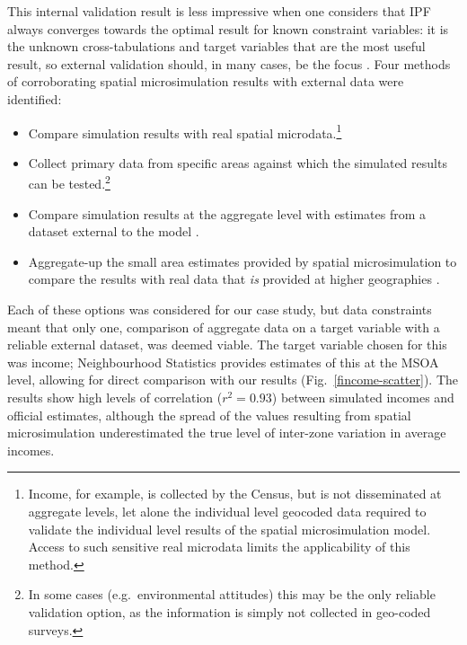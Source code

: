 This internal validation
result is less impressive when one considers that IPF always converges
towards the optimal result for known constraint variables:
it is the unknown cross-tabulations and
target variables that are the most useful result,
so external validation should, in many cases, be the focus
\citep{Morrissey2008, edwards2013validation}.
Four methods of corroborating spatial microsimulation results with external
data were identified:
\begin{itemize}
 \item Compare simulation results with real spatial microdata.\footnote{Income,
for example, is collected by the Census, but is not disseminated at aggregate
levels, let alone the individual level geocoded data required to validate the
individual level results of the spatial microsimulation model. Access to such
sensitive real microdata limits the applicability of this method.}
\item Collect primary data from specific areas against which the simulated
results can be tested.\footnote{In some cases (e.g.~environmental attitudes)
this may be the only reliable validation option, as the information is simply not
collected in geo-coded surveys.}
\item Compare simulation results at the aggregate level with estimates
from a dataset external to the model \citep{Morrissey2013}.
\item Aggregate-up the small area estimates provided by spatial microsimulation
to compare the results with real data that \emph{is} provided at higher
geographies \citep{Edwards2009}.
\end{itemize}
Each of these options was considered for our case study,
but data constraints meant that only one, comparison of aggregate data
on a target variable with a reliable external dataset, was deemed viable.
The target variable chosen for this was income; Neighbourhood Statistics
provides estimates of this at the MSOA level, allowing
for direct comparison with our results (Fig.~\ref{fincome-scatter}). The results show
high levels of correlation ($r^2 = 0.93$) between simulated incomes and official
estimates, although the spread of the values resulting from spatial microsimulation
underestimated the true level of inter-zone variation in average incomes.

